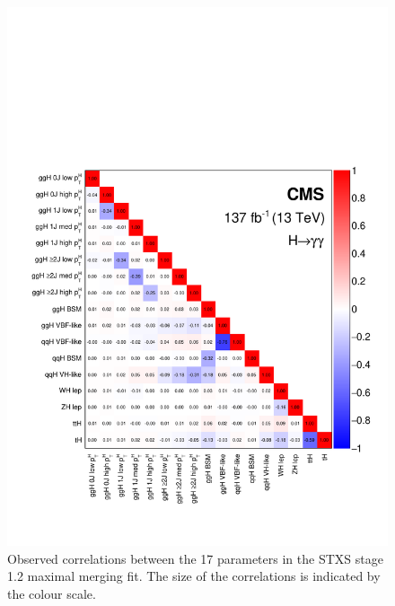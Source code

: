 \begin{figure}[htbp]
  \centering
  \includegraphics[width=.97\textwidth]{Figures/hgg_results/stage1p2_maximal_correlations.pdf}
  \caption[Correlations in the STXS stage 1.2 maximal merging parameters]
  {
    Observed correlations between the 17 parameters in the STXS stage 1.2 maximal merging fit. The size of the correlations is indicated by the colour scale.
  }
  \label{fig:stage1p2_maximal_correlations}
\end{figure}

